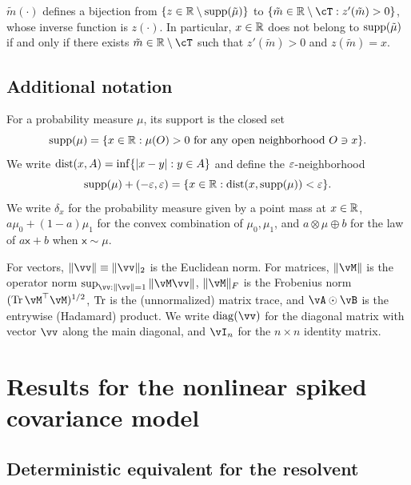 \begin{proposition}\label{prop:inv_z}
$\tilde m(\cdot)$ defines a bijection from $\{z \in \mathbb{R} \setminus \mathrm{supp}({\tilde
\mu})\}$ to $\{\tilde m \in \R \setminus \cT:z'(\tilde m)>0\}$, whose inverse
function is $z(\cdot)$. In particular, $x \in \mathbb{R}$ does not belong to
$\mathrm{supp}({\tilde \mu})$ if and only if there exists
$\tilde m \in \R \setminus \cT$
such that $z'(\tilde m)>0$ and $z(\tilde m)=x$.
\end{proposition}

\subsection{Additional notation}

For a probability measure $\mu$, its support is the closed set
\[\mathrm{supp}({\mu})=\{x \in \mathbb{R}:\mu(O)>0 \text{ for any open neighborhood } O \ni x\}.\]
We write $\textnormal{dist}(x,A)=\inf\{|x-y|:y \in A\}$ and define the $\varepsilon$-neighborhood
\[\mathrm{supp}({\mu})+(-\varepsilon,\varepsilon)=\{x \in \mathbb{R}:\textnormal{dist}(x,\mathrm{supp}({\mu}))<\varepsilon\}.\]
We write $\delta_x$ for the probability measure given by a point mass at
$x \in \mathbb{R}$, $a\mu_0+(1-a)\mu_1$ for the convex combination of $\mu_0,\mu_1$,
and $a \otimes \mu \oplus b$ for
the law of $a\mathsf{x}+b$ when $\mathsf{x} \sim \mu$.

For vectors, $\|\vv\| \equiv \|\vv\|_2$ is the Euclidean norm. For matrices,
$\|\vM\|$ is the
operator norm $\sup_{\vv:\|\vv\|=1} \|\vM\vv\|$, $\|\vM\|_F$ is the
Frobenius norm $(\Tr \vM^\top\vM)^{1/2}$, $\operatorname{Tr}$ is the (unnormalized)
matrix trace, and $\vA \odot \vB$ is the entrywise (Hadamard) product.
We write $\diag(\vv)$ for the diagonal matrix with vector $\vv$ along the
main diagonal, and $\vI_n$ for the $n \times n$ identity matrix.


\section{Results for the nonlinear spiked covariance model}\label{sec:spiked_sample_covariance}

\subsection{Deterministic equivalent for the resolvent}\label{subsec:nonasymptotic}

